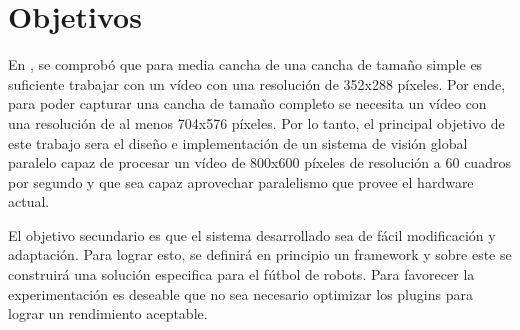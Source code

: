 
\section{Objetivos}

En \cite{torres2014}, se comprobó que para media cancha de una cancha de tamaño
simple es suficiente trabajar con un vídeo con una resolución de 352x288
píxeles. Por ende, para poder capturar una cancha de tamaño completo se necesita
un vídeo con una resolución de al menos 704x576 píxeles. Por lo tanto, el
principal objetivo de este trabajo sera el diseño e implementación de un sistema
de visión global paralelo capaz de procesar un vídeo de 800x600 píxeles de
resolución a 60 cuadros por segundo y que sea capaz aprovechar paralelismo que
provee el hardware actual.

El objetivo secundario es que el sistema desarrollado sea de fácil modificación
y adaptación. Para lograr esto, se definirá en principio un framework y sobre
este se construirá una solución especifica para el fútbol de robots. Para
favorecer la experimentación es deseable que no sea necesario optimizar los
plugins para lograr un rendimiento aceptable.
